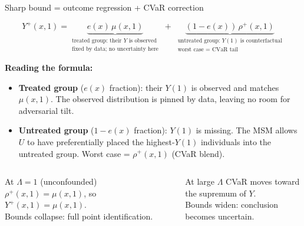 \documentclass[aspectratio=169]{beamer}
\begin{document}
\begin{frame}{Sharp bound = outcome regression + CVaR correction}

\[
  Y^+(x,1) =
  \underbrace{e(x)\,\mu(x,1)}_{\substack{\text{treated group: their $Y$ is observed}\\\text{fixed by data; no uncertainty here}}}
  \;+\;
  \underbrace{(1-e(x))\,\rho^+(x,1)}_{\substack{\text{untreated group: $Y(1)$ is counterfactual}\\\text{worst case = CVaR tail}}}
\]

\medskip
\textbf{Reading the formula:}
\begin{itemize}
  \item \textbf{Treated group} ($e(x)$ fraction): their $Y(1)$ is observed and matches $\mu(x,1)$. The observed distribution is pinned by data, leaving no room for adversarial tilt.
  \item \textbf{Untreated group} ($1-e(x)$ fraction): $Y(1)$ is missing. The MSM allows $U$ to have preferentially placed the highest-$Y(1)$ individuals into the untreated group. Worst case = $\rho^+(x,1)$ (CVaR blend).
\end{itemize}

\medskip
\begin{columns}
\begin{block}{At $\Lambda=1$ (unconfounded)}
$\rho^+(x,1)=\mu(x,1)$, so $Y^+(x,1)=\mu(x,1)$.\\
Bounds collapse: full point identification.
\end{block}
\begin{alertblock}{At large $\Lambda$}
CVaR moves toward the supremum of $Y$.\\
Bounds widen: conclusion becomes uncertain.
\end{alertblock}
\end{columns}
\end{frame}

\end{document}
